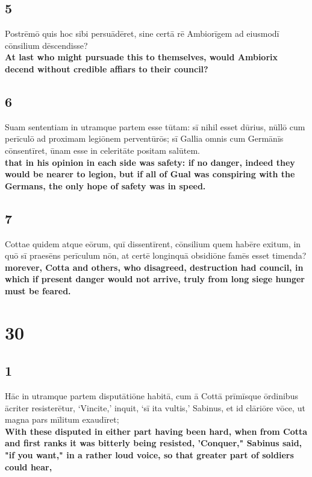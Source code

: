 \documentclass{article}
\begin{document}
\subsection*{5}
Postrēmō quis hoc sibi persuādēret, sine certā rē Ambiorīgem ad eiusmodī cōnsilium dēscendisse? \\
\textbf{At last who might pursuade this to themselves, would Ambiorix decend without credible affiars to their council? }

\subsection*{6}
Suam sententiam in utramque partem esse tūtam: sī nihil esset dūrius, nūllō cum perīculō ad proximam legiōnem perventūrōs; sī Gallia omnis cum Germānīs cōnsentīret, ūnam esse in celeritāte positam salūtem. \\
\textbf{that in his opinion in each side was safety: if no danger, indeed they would be nearer to legion, but if all of Gual was conspiring with the Germans, the only hope of safety was in speed.}

\subsection*{7}
Cottae quidem atque eōrum, quī dissentīrent, cōnsilium quem habēre exitum, in quō sī praesēns perīculum nōn, at certē longinquā obsidiōne famēs esset timenda? \\
\textbf{morever, Cotta and others, who disagreed, destruction had council, in which if present danger would not arrive, truly from long siege hunger must be feared.}

\section*{30}

\subsection*{1}
Hāc in utramque partem disputātiōne habitā, cum ā Cottā prīmīsque ōrdinibus ācriter resisterētur, ‘Vincite,’ inquit, ‘sī ita vultis,’ Sabinus, et id clāriōre vōce, ut magna pars mīlitum exaudīret;\\
\textbf{With these disputed in either part having been hard, when from Cotta and first ranks it was bitterly being resisted, 'Conquer," Sabinus said, "if you want," in a rather loud voice, so that greater part of soldiers could hear,}
\end{document}
